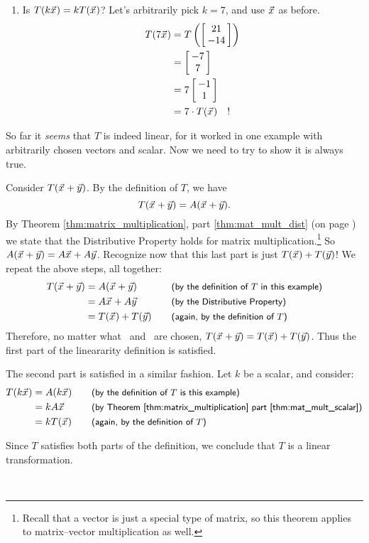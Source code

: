 {\begin{enumerate}
So far, so good: $T(\vx+\vy)$ is equal to  $T(\vx)+T(\vy)$.

	\item		Is $T(k\vx) = kT(\vx)$? Let's arbitrarily pick $k=7$, and use $\vx$ as before.
	\begin{align*} 
			T(7\vx) &= T\left(\bmx{c}21\\-14\emx\right) \\
							&= \bmx{c}-7\\7\emx \\
							&= 7\bmx{c} -1\\1\emx \\
							&= 7\cdot T(\vx) \quad ! 
	\end{align*}
\end{enumerate}

So far it \textit{seems} that $T$ is indeed linear, for it worked in one example with arbitrarily chosen vectors and scalar. Now we need to try to show it is always true. 

Consider $T(\vx+\vy)$. By the definition of $T$, we have $$T(\vx+\vy) = \tta(\vx+\vy).$$ By Theorem \ref{thm:matrix_multiplication}, part \ref{thm:mat_mult_dist} (on page \pageref{thm:matrix_multiplication}) we state that the Distributive Property holds for matrix multiplication.\footnote{Recall that a vector is just a special type of matrix, so this theorem applies to matrix--vector multiplication as well.} So $\tta(\vx+\vy) = \tta\vx + \tta\vy$. Recognize now that this last part is just $T(\vx) + T(\vy)$! We repeat the above steps, all together:
\begin{align*}
T(\vx+\vy)	&= \tta(\vx+\vy) & & \quad \textsf{\small (by the definition of $T$ in this example)}\\
						&= \tta\vx + \tta\vy & & \quad \textsf{\small (by the Distributive Property)}\\
						&= T(\vx) + T(\vy) & & \quad \textsf{\small (again, by the definition of $T$)}
\end{align*}
Therefore, no matter what \vx\ and \vy\ are chosen, $T(\vx+\vy) = T(\vx) + T(\vy)$. Thus the first part of the lineararity definition is satisfied.

The second part is satisfied in a similar fashion. Let $k$ be a scalar, and consider:
\begin{align*}
T(k\vx)	&=	\tta(k\vx) & & \quad \textsf{\small (by the definition of $T$ is this example)}\\
				&=	k\tta\vx & & \quad \textsf{\small (by Theorem \ref{thm:matrix_multiplication} part \ref{thm:mat_mult_scalar})}\\
				&= kT(\vx) & & \quad \textsf{\small (again, by the definition of $T$)}
\end{align*}

Since $T$ satisfies both parts of the definition, we conclude that $T$ is a linear transformation.
}\\

